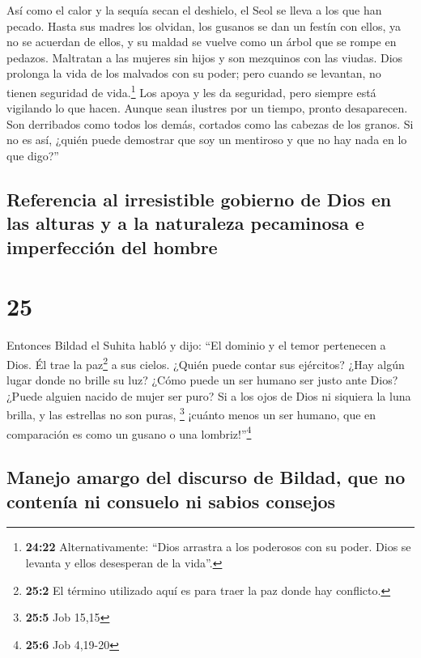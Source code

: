  Así como el calor y la sequía secan el deshielo, el Seol
se lleva a los que han pecado.  Hasta sus madres los
olvidan, los gusanos se dan un festín con ellos, ya no se acuerdan de
ellos, y su maldad se vuelve como un árbol que se rompe en pedazos.
 Maltratan a las mujeres sin hijos y son mezquinos con
las viudas.  Dios prolonga la vida de los malvados con su
poder; pero cuando se levantan, no tienen seguridad de vida.\footnote{\textbf{24:22}
  Alternativamente: ``Dios arrastra a los poderosos con su poder. Dios
  se levanta y ellos desesperan de la vida''.}  Los apoya
y les da seguridad, pero siempre está vigilando lo que hacen.
 Aunque sean ilustres por un tiempo, pronto desaparecen.
Son derribados como todos los demás, cortados como las cabezas de los
granos.  Si no es así, ¿quién puede demostrar que soy un
mentiroso y que no hay nada en lo que digo?''

\hypertarget{referencia-al-irresistible-gobierno-de-dios-en-las-alturas-y-a-la-naturaleza-pecaminosa-e-imperfecciuxf3n-del-hombre}{%
\subsection{Referencia al irresistible gobierno de Dios en las alturas y
a la naturaleza pecaminosa e imperfección del
hombre}\label{referencia-al-irresistible-gobierno-de-dios-en-las-alturas-y-a-la-naturaleza-pecaminosa-e-imperfecciuxf3n-del-hombre}}

\hypertarget{section-24}{%
\section{25}\label{section-24}}

 Entonces Bildad el Suhita habló y dijo: 
``El dominio y el temor pertenecen a Dios. Él trae la paz\footnote{\textbf{25:2}
  El término utilizado aquí es para traer la paz donde hay conflicto.} a
sus cielos.  ¿Quién puede contar sus ejércitos? ¿Hay algún
lugar donde no brille su luz?  ¿Cómo puede un ser humano
ser justo ante Dios? ¿Puede alguien nacido de mujer ser puro?
 Si a los ojos de Dios ni siquiera la luna brilla, y las
estrellas no son puras, \footnote{\textbf{25:5} Job 15,15}
 ¡cuánto menos un ser humano, que en comparación es como
un gusano o una lombriz!''\footnote{\textbf{25:6} Job 4,19-20}

\hypertarget{manejo-amargo-del-discurso-de-bildad-que-no-contenuxeda-ni-consuelo-ni-sabios-consejos}{%
\subsection{Manejo amargo del discurso de Bildad, que no contenía ni
consuelo ni sabios
consejos}\label{manejo-amargo-del-discurso-de-bildad-que-no-contenuxeda-ni-consuelo-ni-sabios-consejos}}

